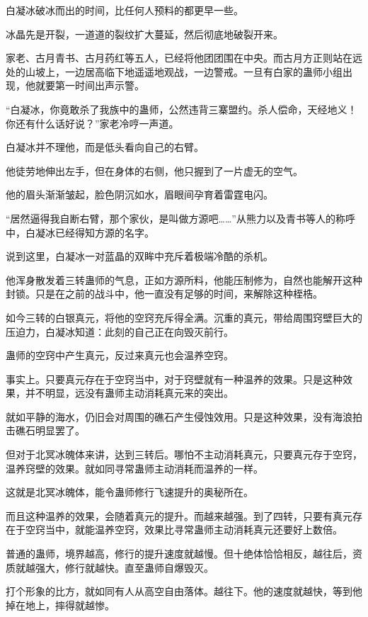 
\begin{this_body}

白凝冰破冰而出的时间，比任何人预料的都更早一些。

冰晶先是开裂，一道道的裂纹扩大蔓延，然后彻底地破裂开来。

家老、古月青书、古月药红等五人，已经将他团团围在中央。而古月方正则站在远处的山坡上，一边居高临下地遥遥地观战，一边警戒。一旦有白家的蛊师小组出现，他就要第一时间出声示警。

“白凝冰，你竟敢杀了我族中的蛊师，公然违背三寨盟约。杀人偿命，天经地义！你还有什么话好说？”家老冷哼一声道。

白凝冰并不理他，而是低头看向自己的右臂。

他徒劳地伸出左手，但在身体的右侧，他只握到了一片虚无的空气。

他的眉头渐渐皱起，脸色阴沉如水，眉眼间孕育着雷霆电闪。

“居然逼得我自断右臂，那个家伙，是叫做方源吧……”从熊力以及青书等人的称呼中，白凝冰已经得知方源的名字。

说到这里，白凝冰一对蓝晶的双眸中充斥着极端冷酷的杀机。

他浑身散发着三转蛊师的气息，正如方源所料，他能压制修为，自然也能解开这种封锁。只是在之前的战斗中，他一直没有足够的时间，来解除这种桎梏。

如今三转的白银真元，将他的空窍充斥得全满。沉重的真元，带给周围窍壁巨大的压迫力，白凝冰知道：此刻的自己正在向毁灭前行。

蛊师的空窍中产生真元，反过来真元也会温养空窍。

事实上。只要真元存在于空窍当中，对于窍壁就有一种温养的效果。只是这种效果，并不明显，远没有蛊师主动消耗真元来的突出。

就如平静的海水，仍旧会对周围的礁石产生侵蚀效用。只是这种效果，没有海浪拍击礁石明显罢了。

但对于北冥冰魄体来讲，达到三转后。哪怕不主动消耗真元，只要真元存于空窍，温养窍壁的效果。就如同寻常蛊师主动消耗而温养的一样。

这就是北冥冰魄体，能令蛊师修行飞速提升的奥秘所在。

而且这种温养的效果，会随着真元的提升。而越来越强。到了四转，只要有真元存在于空窍当中，就能温养空窍，效果比寻常蛊师主动消耗真元还要好上数倍。

普通的蛊师，境界越高，修行的提升速度就越慢。但十绝体恰恰相反，越往后，资质就越强大，修行就越快。直至蛊师自爆毁灭。

打个形象的比方，就如同有人从高空自由落体。越往下。他的速度就越快，等到他掉在地上，摔得就越惨。


\end{this_body}
